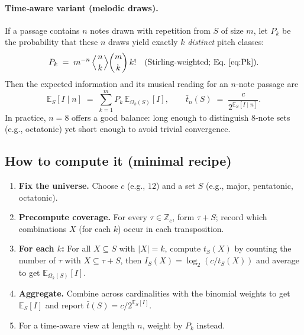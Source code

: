\documentclass[10pt,twocolumn]{article}
\numberwithin{equation}{section} %
\begin{document}
    \paragraph{Time‑aware variant (melodic draws).}
    If a passage contains $n$ notes drawn with repetition from $S$ of size $m$, let $P_k$ be the probability that these $n$ draws yield exactly $k$ \emph{distinct} pitch classes:
    \[
        P_k \;=\; m^{-n}\, \Bigl\langle \genfrac{}{}{0pt}{}{n}{k} \Bigr\rangle \binom{m}{k}\, k!
        \quad\text{(Stirling‑weighted; Eq.~\ref{eq:Pk}).}
    \]
    Then the expected information and its musical reading for an $n$‑note passage are
    \[
        \mathbb{E}_S[I \mid n]
        \;=\; \sum_{k=1}^{m} P_k \, \mathbb{E}_{\Omega_k(S)}[I],
        \qquad
        \bar{t}_n(S) \;=\; \frac{c}{2^{\mathbb{E}_S[I \mid n]}}.
    \]
    In practice, $n{=}8$ offers a good balance: long enough to distinguish 8‑note sets (e.g., octatonic) yet short enough to avoid trivial convergence.

    \subsection*{How to compute it (minimal recipe)}
    \begin{enumerate}
        \item \textbf{Fix the universe.} Choose $c$ (e.g., $12$) and a set $S$ (e.g., major, pentatonic, octatonic).
        \item \textbf{Precompute coverage.} For every $\tau\in \mathbb{Z}_c$, form $\tau{+}S$; record which combinations $X$ (for each $k$) occur in each transposition.
        \item \textbf{For each $k$:} For all $X{\subseteq}S$ with $|X|{=}k$, compute $t_S(X)$ by counting the number of $\tau$ with $X\subseteq \tau{+}S$, then $I_S(X)=\log_2(c/t_S(X))$ and average to get $\mathbb{E}_{\Omega_k(S)}[I]$.
        \item \textbf{Aggregate.} Combine across cardinalities with the binomial weights to get $\mathbb{E}_S[I]$ and report $\bar{t}(S)=c/2^{\mathbb{E}_S[I]}$.
        \item For a time‑aware view at length $n$, weight by $P_k$ instead.
    \end{enumerate}
\end{document}
